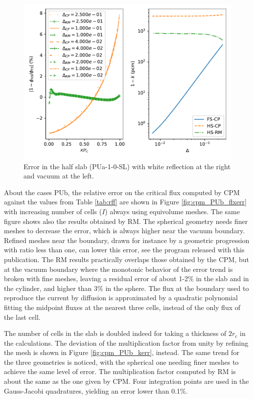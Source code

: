 \documentclass{ictt26}
\begin{document}
\begin{figure}[htbp]
\centering
\includegraphics[width=.8\linewidth]{cpm_hslab_err.pdf}
\caption{Error in the half slab (PUa-1-0-SL) with white reflection at the right and vacuum at the left.}
\label{fig:cpm_hslab_err}
\end{figure}

About the cases PUb, the relative error on the critical flux computed by CPM against the values from Table \ref{tab:rff} are shown in Figure \ref{fig:cpm_PUb_flxerr} with increasing number of cells ($I$) always using equivolume meshes. The same figure shows also the results obtained by RM. The spherical geometry needs finer meshes to decrease the error, which is always higher near the vacuum boundary. Refined meshes near the boundary, drawn for instance by a geometric progression with ratio less than one, can lower this error, see the program released with this publication. The RM results practically overlaps those obtained by the CPM, but at the vacuum boundary where the monotonic behavior of the error trend is broken with fine meshes, leaving a residual error of about 1-2\% in the slab and in the cylinder, and higher than 3\% in the sphere. The flux at the boundary used to reproduce the current by diffusion is approximated by a quadratic polynomial fitting the midpoint fluxes at the nearest three cells, instead of the only flux of the last cell.

The number of cells in the slab is doubled indeed for taking a thickness of $2r_c$ in the calculations. The deviation of the multiplication factor from unity by refining the mesh is shown in Figure \ref{fig:cpm_PUb_kerr}, instead. The same trend for the three geometries is noticed, with the spherical one needing finer meshes to achieve the same level of error. The multiplication factor computed by RM is about the same as the one given by CPM. Four integration points are used in the Gauss-Jacobi quadratures, yielding an error lower than 0.1\%.
\end{document}
